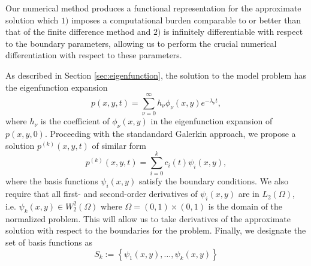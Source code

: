 Our numerical method produces a functional representation for the
approximate solution which $1)$ imposes a computational burden
comparable to or better than that of the finite difference method and
$2)$ is infinitely differentiable with respect to the boundary
parameters, allowing us to perform the crucial numerical
differentiation with respect to these parameters.

As described in Section \ref{sec:eigenfunction}, the solution to the
model problem has the eigenfunction expansion 
\[
  p(x,y,t) = \sum_{\nu=0}^\infty h_\nu \phi_\nu(x,y) e^{-\lambda_\nu t},
\]
where $h_\nu$ is the coefficient of $\phi_\nu(x,y)$ in the
eigenfunction expansion of $p(x,y,0)$. Proceeding with the standandard
Galerkin approach, we propose a solution $p^{(k)}(x,y,t)$ of similar
form
\[
  p^{(k)}(x,y,t) = \sum_{i=0}^k c_i(t) \psi_i(x,y),
\]
where the basis functions $\psi_i(x,y)$ satisfy the boundary
conditions. We also require that all first- and second-order
derivatives of $\psi_i(x,y)$ are in $L_2(\Omega)$, i.e.
$\psi_k(x,y) \in W_{2}^{2}(\Omega)$ where
$\Omega = (0,1) \times (0,1)$ is the domain of the normalized
problem. This will allow us to take derivatives of the approximate
solution with respect to the boundaries for the problem. Finally, we
designate the set of basis functions as
\[
  S_k := \left\{ \psi_1(x,y), \ldots, \psi_k(x,y) \right\}
\]

